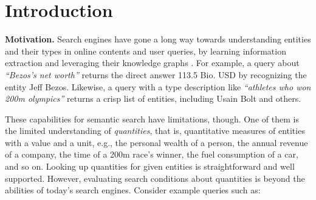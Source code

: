
\section{Introduction}\label{sec:intro}




\noindent \textbf{Motivation.} Search engines have gone a long way towards understanding
entities and their types in online contents and user queries,
by learning information extraction and 
leveraging their knowledge graphs \cite{DBLP:journals/cacm/NoyGJNPT19}.
For example, a query about \textit{``Bezos's net worth''}
returns the direct answer 113.5 Bio. USD by recognizing
the entity Jeff Bezos.
Likewise, a query with a type description like \textit{``athletes who won 200m olympics''}
returns a crisp list of entities, including Usain Bolt and others.

These capabilities for semantic search \cite{DBLP:journals/ftir/BastBH16, DBLP:conf/rweb/BastS18, DBLP:conf/ecir/GarigliottiB18}
have limitations, though.
One of them is the limited understanding of {\em quantities},
that is, quantitative measures of entities with a value and a unit, e.g.,
the personal wealth of a person, the annual
revenue of a company, the time of a 200m race's winner,
the fuel consumption of a car, and so on.
Looking up quantities for given entities is straightforward
and well supported. However, evaluating search conditions
about quantities is beyond the abilities of today's search engines. %
Consider example queries such as:

